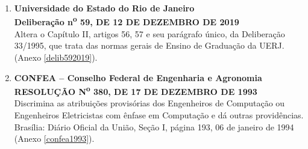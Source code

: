 \begin{enumerate}
    \item \textbf{Universidade do Estado do Rio de Janeiro}  \\
          \textbf{Deliberação n\textsuperscript{o} 59, DE 12 DE DEZEMBRO DE 2019}  \\
          Altera o Capítulo II, artigos 56, 57 e seu parágrafo único, da Deliberação 33/1995, que trata das normas gerais de Ensino de Graduação da UERJ. (Anexo \ref{delib592019}).

    \item \textbf{CONFEA – Conselho Federal de Engenharia e Agronomia} \\
          \textbf{RESOLUÇÃO N\textsuperscript{o} 380, DE 17 DE DEZEMBRO DE 1993}  \\
          Discrimina as atribuições provisórias dos Engenheiros de Computação ou Engenheiros Eletricistas com ênfase em Computação e dá outras providências. Brasília: Diário Oficial da União, Seção I, página 193, 06 de janeiro de 1994 (Anexo \ref{confea1993}).
\end{enumerate}

